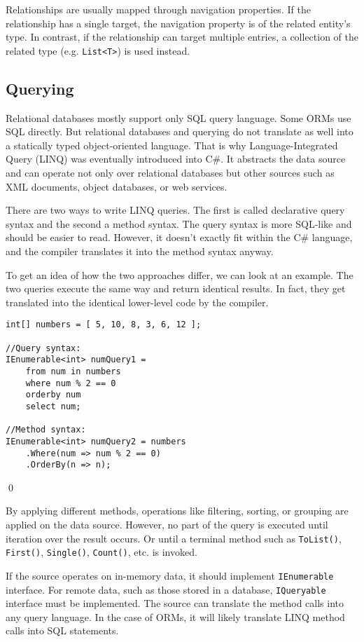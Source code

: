 Relationships are usually mapped through navigation properties. If the relationship has a single target, the navigation property is of the related entity's type. In contrast, if the relationship can target multiple entries, a collection of the related type (e.g. \texttt{List<T>}) is used instead.

\subsection{Querying}
Relational databases mostly support only SQL query language. Some ORMs use SQL directly. But relational databases and querying do not translate as well into a statically typed object-oriented language. That is why Language-Integrated Query (LINQ) was eventually introduced into C\#. It abstracts the data source and can operate not only over relational databases but other sources such as XML documents, object databases, or web services. \cite{linq}

There are two ways to write LINQ queries. The first is called declarative query syntax and the second a method syntax. The query syntax is more SQL-like and should be easier to read. However, it doesn't exactly fit within the C\# language, and the compiler translates it into the method syntax anyway.
\begin{example}

To get an idea of how the two approaches differ, we can look at an example\cite{linqQueries}. The two queries execute the same way and return identical results. In fact, they get translated into the identical lower-level code by the compiler.

\begin{lstlisting}[language=CSharp]
int[] numbers = [ 5, 10, 8, 3, 6, 12 ];

//Query syntax:
IEnumerable<int> numQuery1 =
    from num in numbers
    where num % 2 == 0
    orderby num
    select num;

//Method syntax:
IEnumerable<int> numQuery2 = numbers
    .Where(num => num % 2 == 0)
    .OrderBy(n => n);
\end{lstlisting}
\qed
\end{example}

By applying different methods, operations like filtering, sorting, or grouping are applied on the data source. However, no part of the query is executed until iteration over the result occurs. Or until a terminal method such as \texttt{ToList()}, \texttt{First()}, \texttt{Single()}, \texttt{Count()}, etc. is invoked. 

If the source operates on in-memory data, it should implement \texttt{IEnumerable} interface. For remote data, such as those stored in a database, \texttt{IQueryable} interface must be implemented. The source can translate the method calls into any query language. In the case of ORMs, it will likely translate LINQ method calls into SQL statements. \cite{linq}